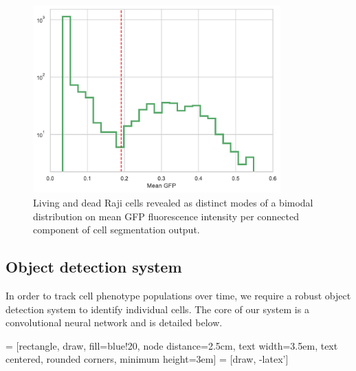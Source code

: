 \begin{figure}[htb]
\centering
\includegraphics[width=0.85\textwidth]{img/gfp_bimodal.pdf}
\caption{Living and dead Raji cells revealed as distinct modes of a bimodal distribution on mean GFP fluorescence intensity per connected component of cell segmentation output.}
\label{fig:gfp_bimodal}
\end{figure}

\subsection{Object detection system}
\label{subsec:training}

In order to track cell phenotype populations over time, we require a robust object detection system to identify individual cells. The core of our system is a convolutional neural network and is detailed below.

 = [rectangle, draw, fill=blue!20, node distance=2.5cm,
    text width=3.5em, text centered, rounded corners, minimum height=3em]
 = [draw, -latex']

